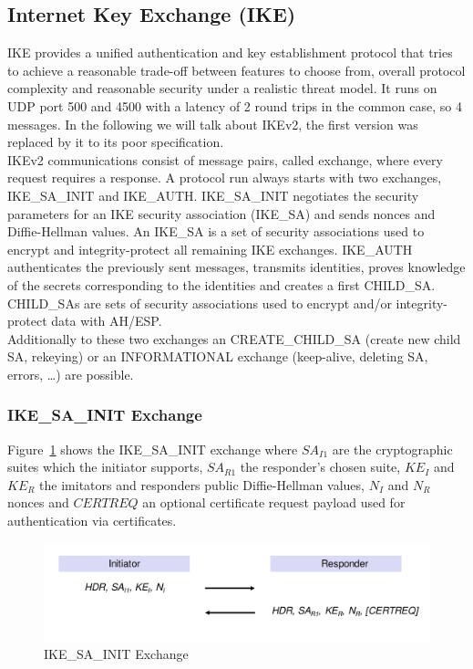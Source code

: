 \subsection{Internet Key Exchange (IKE)}
IKE provides a unified authentication and key establishment protocol that tries to achieve a reasonable trade-off between features to choose from, overall protocol complexity and reasonable security under a realistic threat model.
It runs on UDP port 500 and 4500 with a latency of 2 round trips in the common case, so 4 messages.
In the following we will talk about IKEv2, the first version was replaced by it to its poor specification.\\

IKEv2 communications consist of message pairs, called exchange, where every request requires a response.
A protocol run always starts with two exchanges, IKE\_SA\_INIT and IKE\_AUTH\@.
IKE\_SA\_INIT negotiates the security parameters for an IKE security association (IKE\_SA) and sends nonces and Diffie-Hellman values.
An IKE\_SA is a set of security associations used to encrypt and integrity-protect all remaining IKE exchanges.
IKE\_AUTH authenticates the previously sent messages, transmits identities, proves knowledge of the secrets corresponding to the identities and creates a first CHILD\_SA\@.
CHILD\_SAs are sets of security associations used to encrypt and/or integrity-protect data with AH/ESP.\\
Additionally to these two exchanges an CREATE\_CHILD\_SA (create new child SA, rekeying) or an INFORMATIONAL exchange (keep-alive, deleting SA, errors, \dots) are possible.

\subsubsection{IKE\_SA\_INIT Exchange}
Figure~\ref{fig:ike_sa_init} shows the IKE\_SA\_INIT exchange where $SA_{I1}$ are the cryptographic suites which the initiator supports, $SA_{R1}$ the responder's chosen suite, $KE_I$ and $KE_R$ the imitators and responders public Diffie-Hellman values, $N_I$ and $N_R$ nonces and $CERTREQ$ an optional certificate request payload used for authentication via certificates.
\begin{figure}[H]
  \centering
  \includegraphics[width=.8\textwidth]{figures/ike_sa_init.png}
  \caption{IKE\_SA\_INIT Exchange}\label{fig:ike_sa_init}
\end{figure}

